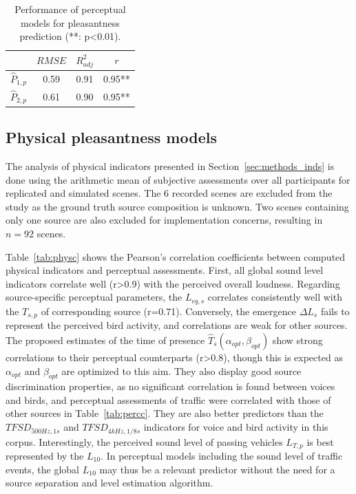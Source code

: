 \documentclass[twocolumn]{article}
\begin{document}
\begin{table}[t]
\centering
\caption{Performance of perceptual models for pleasantness prediction (**: p<0.01).}
\label{tab:percm}
\begin{tabular}{ c | c | c | c }
\hline
	 & $RMSE$ & $R^2_{adj}$ & $r$ \\ \hline
	$\hat P_{1, p}$ & 0.59 & 0.91 & 0.95** \\
	$\hat P_{2, p}$ & 0.61 & 0.90 & 0.95** \\ \hline
\end{tabular}
\end{table}

\subsection{Physical pleasantness models}
\label{sec:results_phys}

The analysis of physical indicators presented in Section~\ref{sec:methods_inds} is done using the arithmetic mean of subjective assessments over all participants for replicated and simulated scenes. The 6 recorded scenes are excluded from the study as the ground truth source composition is unknown. Two scenes containing only one source are also excluded for implementation concerns, resulting in $n=92$ scenes.

Table~\ref{tab:physc} shows the Pearson's correlation coefficients between computed physical indicators and perceptual assessments. First, all global sound level indicators correlate well (r>0.9) with the perceived overall loudness. Regarding source-specific perceptual parameters, the $L_{eq, s}$ correlates consistently well with the $T_{s, p}$ of corresponding source (r=0.71). Conversely, the emergence $\Delta L_s$ fails to represent the perceived bird activity, and correlations are weak for other sources. The proposed estimates of the time of presence $\hat T_s(\alpha_{opt}, \beta_{opt})$ show strong correlations to their perceptual counterparts (r>0.8), though this is expected as $\alpha_{opt}$ and $\beta_{opt}$ are optimized to this aim. They also display good source discrimination properties, as no significant correlation is found between voices and birds, and perceptual assessments of traffic were correlated with those of other sources in Table~\ref{tab:percc}. They are also better predictors than the $TFSD_{500Hz, 1s}$ and $TFSD_{4kHz, 1/8s}$ indicators for voice and bird activity in this corpus. Interestingly, the perceived sound level of passing vehicles $L_{T, p}$ is best represented by the $L_{10}$. In perceptual models including the sound level of traffic events, the global $L_{10}$ may thus be a relevant predictor without the need for a source separation and level estimation algorithm.
\end{document}
